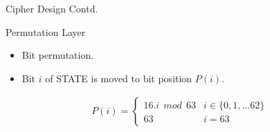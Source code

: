 \begin{frame}{Cipher Design Contd.}
    \begin{block}{Permutation Layer}
        \begin{itemize}
            \item Bit permutation.
            \item Bit $i$ of \textsc{STATE} is moved to bit position $P(i)$.
        \end{itemize}
        \begin{eqnarray*}
         P(i) =  \begin{cases}
              16.i~~ mod~~ 63 & i \in \{0,1,\dots 62 \}\\
              63 & i = 63
           \end{cases}
        \end{eqnarray*}
    \end{block}
\end{frame}
